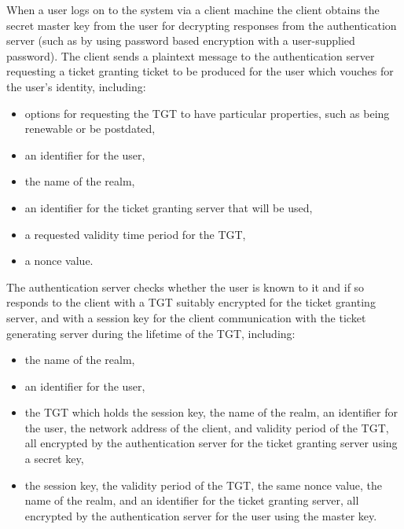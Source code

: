 When a user logs on to the system via a client machine the client obtains
the secret master key from the user for decrypting responses from the
authentication server
(such as by using password based encryption with a user-supplied password).
The client sends a plaintext message to the authentication server
requesting a ticket granting ticket to be produced for the user which vouches
for the user's identity, including:
\begin{itemize}
  \item options for requesting the TGT to have particular properties,
  such as being renewable or be postdated,
  \item an identifier for the user,
  \item the name of the realm,
  \item an identifier for the ticket granting server that will be used,
  \item a requested validity time period for the TGT,
  \item a nonce value.
\end{itemize}
The authentication server checks whether the user is known to it and
if so responds to the client with a TGT suitably encrypted for the ticket granting server,
and with a session key for the client communication with the ticket generating
server during the lifetime of the TGT, including:
\begin{itemize}
  \item the name of the realm,
  \item an identifier for the user,
  \item the TGT which holds the session key, the name of the realm,
  an identifier for the user, the network address of the client,
  and validity period of the TGT, all encrypted by the authentication server
  for the ticket granting server using a secret key,
  \item the session key, the validity period of the TGT, the same nonce value,
  the name of the realm, and an identifier for the ticket granting server,
  all encrypted by the authentication server for the user using the master key.
\end{itemize}

